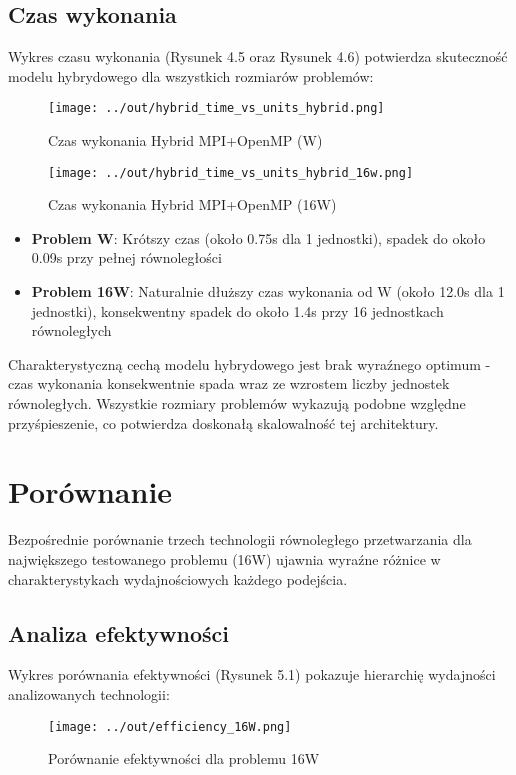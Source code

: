 \documentclass[12pt,a4paper]{report}
\begin{document}
\section{Czas wykonania}
Wykres czasu wykonania (Rysunek 4.5 oraz Rysunek 4.6) potwierdza skuteczność modelu hybrydowego dla wszystkich rozmiarów problemów:
\begin{figure}[h]
    \centering
    \texttt{[image: ../out/hybrid\_time\_vs\_units\_hybrid.png]}
    \caption{Czas wykonania Hybrid MPI+OpenMP (W)}
    \label{fig:hybrid_time}
\end{figure}
\begin{figure}[h]
    \centering
    \texttt{[image: ../out/hybrid\_time\_vs\_units\_hybrid\_16w.png]}
    \caption{Czas wykonania Hybrid MPI+OpenMP (16W)}
    \label{fig:hybrid_time_16w}
\end{figure}
\begin{itemize}
    \item \textbf{Problem W}: Krótszy czas (około 0.75s dla 1 jednostki), spadek do około 0.09s przy pełnej równoległości
    \item \textbf{Problem 16W}: Naturalnie dłuższy czas wykonania od W (około 12.0s dla 1 jednostki), konsekwentny spadek do około 1.4s przy 16 jednostkach równoległych
\end{itemize}

Charakterystyczną cechą modelu hybrydowego jest brak wyraźnego optimum - czas wykonania konsekwentnie spada wraz ze wzrostem liczby jednostek równoległych. Wszystkie rozmiary problemów wykazują podobne względne przyśpieszenie, co potwierdza doskonałą skalowalność tej architektury.

\chapter{Porównanie}

Bezpośrednie porównanie trzech technologii równoległego przetwarzania dla największego testowanego problemu (16W) ujawnia wyraźne różnice w charakterystykach wydajnościowych każdego podejścia.

\section{Analiza efektywności}

Wykres porównania efektywności (Rysunek 5.1) pokazuje hierarchię wydajności analizowanych technologii:

\begin{figure}[h]
    \centering
    \texttt{[image: ../out/efficiency\_16W.png]}
    \caption{Porównanie efektywności dla problemu 16W}
    \label{fig:comparison_efficiency}
\end{figure}
\end{document}
